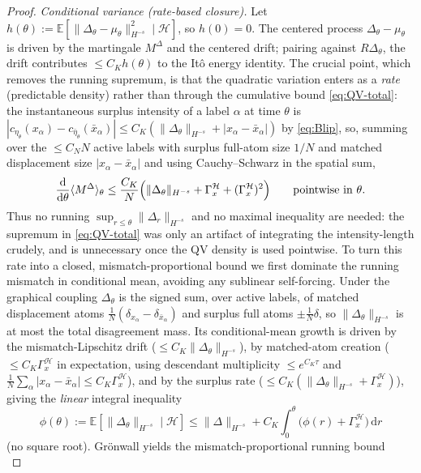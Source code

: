\documentclass[a4paper,fleqn]{cas-sc}
\theoremstyle{definition}
\theoremstyle{remark}
\begin{document}
\begin{proof}
\emph{Conditional variance (rate-based closure).} Let
$h(\theta):=\mathbb E[\|\Delta_\theta-\mu_\theta\|_{H^{-s}}^2\mid\mathcal H]$, so
$h(0)=0$. The centered process
$\Delta_\theta-\mu_\theta$ is driven by the martingale $M^\Delta$ and the centered
drift; pairing against $R\Delta_\theta$, the drift contributes $\le C_Kh(\theta)$ to
the It\^o energy identity. The crucial point, which removes the running supremum,
is that the quadratic variation enters as a \emph{rate} (predictable density) rather
than through the cumulative bound \eqref{eq:QV-total}: the instantaneous surplus
intensity of a label $\alpha$ at time $\theta$ is
$|c_{\eta_\theta}(x_\alpha)-c_{\bar\eta_\theta}(\bar x_\alpha)|
\le C_K(\|\Delta_\theta\|_{H^{-s}}+|x_\alpha-\bar x_\alpha|)$ by \eqref{eq:Blip}, so,
summing over the $\le C_NN$ active labels with surplus full-atom size $1/N$ and
matched displacement size $|x_\alpha-\bar x_\alpha|$ and using Cauchy--Schwarz in
the spatial sum,
\[
\frac{\mathrm d}{\mathrm d\theta}\langle M^\Delta\rangle_\theta
\le\frac{C_K}{N}\Bigl(\|\Delta_\theta\|_{H^{-s}}+\Gamma_x^{\mathcal H}+(\Gamma_x^{\mathcal H})^2\Bigr)
\qquad\text{pointwise in }\theta.
\]
Thus no running $\sup_{r\le\theta}\|\Delta_r\|_{H^{-s}}$ and no maximal inequality are
needed: the supremum in \eqref{eq:QV-total} was only an artifact of integrating the
intensity-length crudely, and is unnecessary once the QV density is used pointwise.
To turn this rate into a closed, mismatch-proportional bound we first dominate the
running mismatch in conditional mean, avoiding any sublinear self-forcing. Under the
graphical coupling $\Delta_\theta$ is the signed sum, over active labels, of matched
displacement atoms $\frac1N(\delta_{x_\alpha}-\delta_{\bar x_\alpha})$ and surplus
full atoms $\pm\frac1N\delta$, so $\|\Delta_\theta\|_{H^{-s}}$ is at most the total
disagreement mass. Its conditional-mean growth is driven by the mismatch-Lipschitz
drift ($\le C_K\|\Delta_\theta\|_{H^{-s}}$), by matched-atom creation
($\le C_K\Gamma_x^{\mathcal H}$ in expectation, using descendant multiplicity
$\le e^{C_K\tau}$ and $\frac1N\sum_\alpha|x_\alpha-\bar x_\alpha|\le C_K\Gamma_x^{\mathcal H}$),
and by the surplus rate ($\le C_K(\|\Delta_\theta\|_{H^{-s}}+\Gamma_x^{\mathcal H})$),
giving the \emph{linear} integral inequality
\[
\phi(\theta):=\mathbb E[\|\Delta_\theta\|_{H^{-s}}\mid\mathcal H]
\le\|\Delta\|_{H^{-s}}+C_K\!\int_0^\theta\bigl(\phi(r)+\Gamma_x^{\mathcal H}\bigr)\,\mathrm dr
\]
(no square root). Gr\"onwall yields the mismatch-proportional running bound
\begin{equation}\label{eq:run-mismatch}

\end{equation}
\end{proof}
\end{document}
